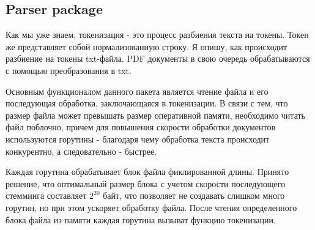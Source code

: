 \subsection{Parser package}
Как мы уже знаем, токенизация - это процесс разбиения текста на токены. 
Токен же представляет собой нормализованную строку. Я опишу, как происходит 
разбиение на токены txt-файла.
PDF документы в свою очередь обрабатываются с помощью преобразования в txt. 

Основным функционалом данного пакета является чтение файла и его последующая обработка, заключающаяся в токенизации. 
В связи с тем, что размер файла может превышать размер оперативной памяти, необходимо 
читать файл поблочно, причем для повышения скорости обработки документов используются горутины - благодаря
чему обработка текста происходит конкурентно, а следовательно - быстрее.  
\par
Каждая горутина обрабатывает блок файла фиклированной длины. Принято решение, что оптимальный размер блока с учетом скорости 
последующего стемминга составляет $2^{20}$ байт, что позволяет не создавать слишком много горутин, но при этом 
ускоряет обработку файла. После чтения определенного блока файла из памяти каждая горутина вызыват функцию токенизации. 

